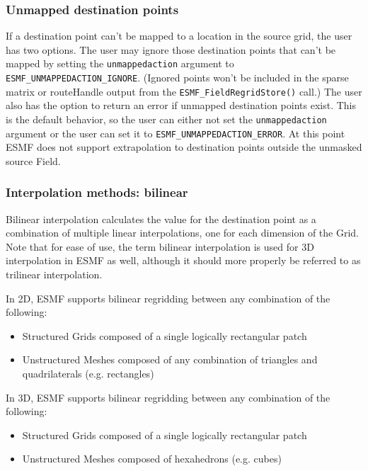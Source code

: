\subsubsection{Unmapped destination points}
 If a destination point can't be mapped to a location in the source grid, the user has two options. The user may ignore those destination points
 that can't be mapped by setting the {\tt unmappedaction} argument to {\tt ESMF\_UNMAPPEDACTION\_IGNORE}. (Ignored points won't be included in
 the sparse matrix or routeHandle output from the {\tt ESMF\_FieldRegridStore()} call.)   The user also has the option to return
 an error if unmapped destination points exist. This is the default behavior, so the user can either not set the {\tt unmappedaction} argument
 or the user can set it to {\tt ESMF\_UNMAPPEDACTION\_ERROR}. At this point ESMF does not support extrapolation to destination points outside 
 the unmasked source Field. 


\subsubsection{Interpolation methods: bilinear}
 Bilinear interpolation calculates the value for the 
 destination point as a combination of multiple linear interpolations, one for each dimension of the Grid. Note that for ease of 
 use, the term bilinear interpolation is used for 3D interpolation in ESMF as well, although it should more properly be referred 
 to as trilinear interpolation.

\smallskip

 In 2D, ESMF supports bilinear regridding between any combination of the following:
 \begin{itemize}
 \item Structured Grids composed of a single logically rectangular patch
 \item Unstructured Meshes composed of any combination of triangles and quadrilaterals (e.g. rectangles)
 \end{itemize}

\smallskip

 In 3D, ESMF supports bilinear regridding between any combination of the following:
 \begin{itemize}
 \item Structured Grids composed of a single logically rectangular patch
 \item Unstructured Meshes composed of hexahedrons (e.g. cubes)
 \end{itemize}

